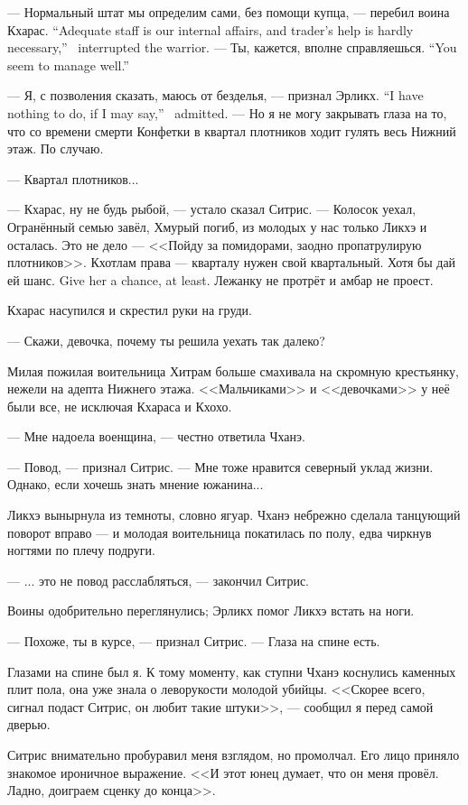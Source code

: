{--- Нормальный штат мы определим сами, без помощи купца, --- перебил воина Кхарас.}
{``Adequate staff is our internal affairs, and trader's help is hardly necessary,'' \Kcharas\ interrupted the warrior.}
{--- Ты, кажется, вполне справляешься.}
{``You seem to manage well.''}

{--- Я, с позволения сказать, маюсь от безделья, --- признал Эрликх.}
{``I have nothing to do, if I may say,'' \Oerlikch\ admitted.}
--- Но я не могу закрывать глаза на то, что со времени смерти Конфетки в квартал плотников ходит гулять весь Нижний этаж.
По случаю.

--- Квартал плотников...

--- Кхарас, ну не будь рыбой, --- устало сказал Ситрис.
--- Колосок уехал, Огранённый семью завёл, Хмурый погиб, из молодых у нас только Ликхэ и осталась.
Это не дело --- <<Пойду за помидорами, заодно пропатрулирую плотников>>.
Кхотлам права --- кварталу нужен свой квартальный.
{Хотя бы дай ей шанс.}
{Give her a chance, at least.}
Лежанку не протрёт и амбар не проест.

Кхарас насупился и скрестил руки на груди.

--- Скажи, девочка, почему ты решила уехать так далеко?

Милая пожилая воительница Хитрам больше смахивала на скромную крестьянку, нежели на адепта Нижнего этажа.
<<Мальчиками>> и <<девочками>> у неё были все, не исключая Кхараса и Кхохо.

--- Мне надоела военщина, --- честно ответила Чханэ.

--- Повод, --- признал Ситрис.
--- Мне тоже нравится северный уклад жизни.
Однако, если хочешь знать мнение южанина...

Ликхэ вынырнула из темноты, словно ягуар.
Чханэ небрежно сделала танцующий поворот вправо --- и молодая воительница покатилась по полу, едва чиркнув ногтями по плечу подруги.

--- ... это не повод расслабляться, --- закончил Ситрис.

Воины одобрительно переглянулись;
Эрликх помог Ликхэ встать на ноги.

--- Похоже, ты в курсе, --- признал Ситрис.
--- Глаза на спине есть.

Глазами на спине был я.
К тому моменту, как ступни Чханэ коснулись каменных плит пола, она уже знала о леворукости молодой убийцы.
<<Скорее всего, сигнал подаст Ситрис, он любит такие штуки>>, --- сообщил я перед самой дверью.

Ситрис внимательно пробуравил меня взглядом, но промолчал.
Его лицо приняло знакомое ироничное выражение.
<<И этот юнец думает, что он меня провёл.
Ладно, доиграем сценку до конца>>.

